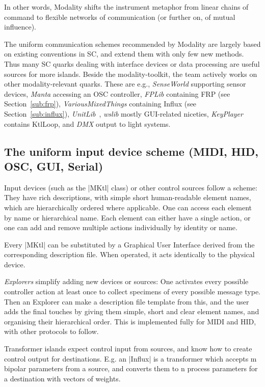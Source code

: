 \documentclass{article}
\begin{document}
In other words, Modality shifts the instrument metaphor from linear chains of command to flexible networks of communication (or further on, of mutual influence).

The uniform communication schemes recommended by Modality are largely based on existing conventions in SC, and extend them with only few new methods. Thus many SC quarks dealing with interface devices or data processing are useful sources for more islands. 
Beside the modality-toolkit\cite{githubmodality}, the team actively works on other modality-relevant quarks.
These are e.g., 
\emph{SenseWorld} supporting sensor devices, 
\emph{Manta} accessing an OSC controller, 
\emph{FPLib} containing FRP (see Section~\ref{sub:frp}), 
\emph{VariousMixedThings} containing Influx (see Section~\ref{sub:influx}), 
\emph{UnitLib}~\cite{-uni}, 
\emph{wslib} mostly GUI-related niceties, 
\emph{KeyPlayer} contains KtlLoop, and 
\emph{DMX} output to light systems.


\subsection{The uniform input device scheme (MIDI, HID, OSC, GUI, Serial)}
\label{sub:the_uniform_input_device_scheme_midi_hid_osc_gui_serial_}

Input devices (such as the |MKtl| class) or other control sources follow a scheme:
They have rich descriptions, with simple short human-readable element names, which are hierarchically ordered where applicable. 
One can access each element by name or hierarchical name.
Each element can either have a single action, or one can add and remove multiple actions individually by identity or name.

Every |MKtl| can be substituted by a Graphical User Interface derived from the corresponding description file.
When operated, it acts identically to the physical device.

\emph{Explorers} simplify adding new devices or sources: 
One activates every possible controller action at least once to collect specimens of every possible message type. 
Then an Explorer can make a description file template from this, and the user adds the final touches by giving them simple, short and clear element names, and organising their hierarchical order. 
This is implemented fully for MIDI and HID, with other protocols to follow.

Transformer islands expect control input from sources, and know how to create control output for destinations. E.g. an |Influx| is a transformer which accepts m bipolar parameters from a source, and converts them to n process parameters for a destination with vectors of weights. 
\end{document}

